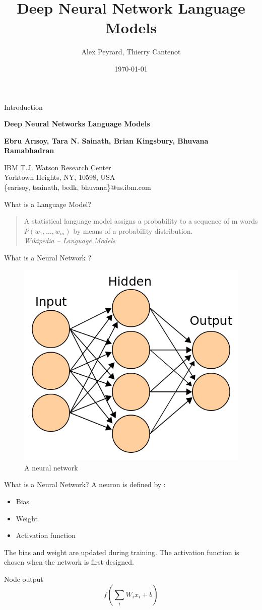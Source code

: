 \documentclass{beamer}
\title[DNNLM]{Deep Neural Network Language Models}
\author[A. Peyrard, T. Cantenot]{Alex Peyrard, Thierry Cantenot}
\institute{Shanghai JiaoTong University}
\date{\today}
\begin{document}
\begin{frame}[plain]
	  \titlepage
\end{frame}

\begin{frame}{Introduction}
	\begin{center}
		\textbf{Deep Neural Networks Language Models}
	\end{center}

	\begin{center}
		\textbf{\small{Ebru Arısoy, Tara N. Sainath, Brian Kingsbury, Bhuvana Ramabhadran}}
	\end{center}
	\begin{center}
		IBM T.J. Watson Research Center\\
		Yorktown Heights, NY, 10598, USA\\
		\{earisoy, tsainath, bedk, bhuvana\}@us.ibm.com
	\end{center}
\end{frame}

\begin{frame}{What is a Language Model?}
	\begin{quote}
		A statistical language model assigns a probability to a sequence of m words $P(w_1,\ldots,w_m)$ by means of a probability distribution. \\ \flushright\emph{Wikipedia -- Language Models}
	\end{quote}
\end{frame}

\begin{frame}{What is a Neural Network ?}
\begin{figure}[!ht]
	\centering
	\rule{0cm}{0cm}
    \includegraphics[width=0.5\linewidth]{./images/ANN.png}
	\caption{A neural network}
\end{figure}
\end{frame}

\begin{frame}{What is a Neural Network?}
	A neuron is defined by :
	\begin{itemize}
		\item Bias
		\item Weight
		\item Activation function
	\end{itemize}
	\vspace{5mm}
	The bias and weight are updated during training. The activation function is chosen when the network is first designed.
	\begin{exampleblock}{Node output}
	\[f(\sum\limits_{i}W_{i}x_{i} + b)\]
	\end{exampleblock}
\end{frame}
\end{document}
